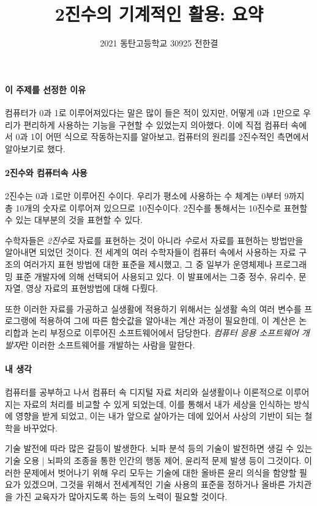 \documentclass{article}
\title{2진수의 기계적인 활용: 요약}
\author{2021 동탄고등학교 30925 전한결}
\begin{document}
\maketitle

\paragraph{이 주제를 선정한 이유}
컴퓨터가 0과 1로 이루어져있다는 말은 많이 들은 적이 있지만,
어떻게 0과 1만으로 우리가 편리하게 사용하는 기능을 구현할 수 있었는지 의아했다.
이에 직접 컴퓨터 속에서 0과 1이 어떤 식으로 작동하는지를 알아보고,
컴퓨터의 원리를 2진수적인 측면에서 알아보기로 했다.

\paragraph{2진수와 컴퓨터속 사용}
2진수는 0과 1로만 이루어진 수이다.
우리가 평소에 사용하는 수 체계는 0부터 9까지 총 10개의 숫자로 이루어져 있으므로 10진수이다.
2진수를 통해서는 10진수로 표현할 수 있는 대부분의 것을 표현할 수 있다.

수학자들은 \textit{2진수}로 자료를 표현하는 것이 아니라 \textit{수}로서 자료를 표현하는
방법만을 알아내면 되었던 것이다.
전 세계의 여러 수학자들이 컴퓨터 속에서 사용하는 자료 구조의 여러가지 표현 방법에 대한
표준을 제시했고, 그 중 일부가 운영체제나 프로그래밍 표준 개발자에 의해 선택되어
사용되고 있다.
이 발표에서는 그중 정수, 유리수, 문자열, 영상 자료의 표현방법에 대해 다뤘다.

또한 이러한 자료를 가공하고 실생활에 적용하기 위해서는 실생활 속의 여러 변수를 프로그랭에
적용하여 그에 따른 함숫값을 알아내는 계산 과정이 필요한데, 이 계산은 논리합과 논리 부정으로 이루어진
소프트웨어에서 담당한다.
\textit{컴퓨터 응용 소프트웨어 개발자}란 이러한 소프트웨어를 개발하는 사람을 말한다.

\paragraph{내 생각}
컴퓨터를 공부하고 나서 컴퓨터 속 디지털 자료 처리와 실생활이나 이론적으로 이루어지는 자료의 처리를
비교할 수 있게 되었는데, 이를 통해서 내가 세상을 인식하는 방식에 영향을 받게 되었고, 이는
내가 앞으로 살아가는 데에 있어서 사상의 기반이 되는 철학을 바꾸었다.

기술 발전에 따라 많은 갈등이 발생한다. 뇌파 분석 등의 기술이 발전하면 생길 수 있는
기술 오용 | 뇌파의 조종을 통한 인간의 행동 제어, 윤리적 문제 발생 등이 그것이다.
이러한 문제에서 벗어나기 위해 우리 모두는 기술에 대한 올바른 윤리 의식을 함양할 필요가 있겠으며,
그것을 위해서 전세계적인 기술 사용의 표준을 정하거나 올바른 가치관을 가진 교육자가
많아지도록 하는 등의 노력이 필요할 것이다.
\end{document}
